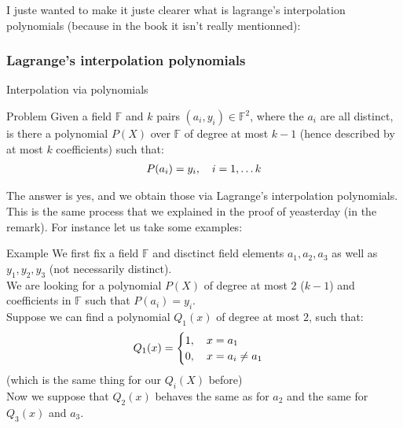    
   
 I juste wanted to make it juste clearer what is lagrange's interpolation polynomials (because in the book it isn't really mentionned):
 \subsubsection{Lagrange's interpolation polynomials}
 \begin{parag}{Interpolation via polynomials}
     \begin{subparag}{Problem}
         Given a field $\mathbb{F}$ and $k$ pairs $\left(a_i, y_i\right)\in \mathbb{F}^2$, where the $a_i$ are all distinct, is there a polynomial $P\left(X\right)$ over $\mathbb{F}$ of degree at most $k-1$ (hence described by at most $k$ coefficients) such that:
         \begin{align*} 
             P\left(a_i\right) =  y_i, \mathspace i = 1, \ldots k
         \end{align*}
     \end{subparag}
     The answer is yes, and we obtain those via Lagrange's interpolation polynomials.\\
     This is the same process that we explained in the proof of yeasterday (in the remark). For instance let us take some examples:
     \begin{subparag}{Example}
         We first fix a field $\mathbb{F}$ and disctinct field elements $a_1, a_2, a_3$ as well as $y_1, y_2, y_3  $ (not necessarily distinct).\\
         We are looking for a polynomial $P\left(X\right)$ of degree at most $2$ ($k-1 $) and coefficients in $\mathbb{F}$ such that $P\left(a_i\right) =  y_i$.\\
         Suppose we can find a polynomial $Q_1\left(x\right)$ of degree at most $2$, such that:
         \begin{align*} 
             Q_1\left(x\right) =  
             \begin{cases}
                 1, \mathspace x = a_1\\
                 0, \mathspace x =  a_i \neq a_1
             \end{cases}
         \end{align*}
         (which is the same thing for our $Q_i\left(X\right)$ before)\\
         Now we suppose that $Q_2\left(x\right)$ behaves the same as for $a_2$ and the same for $Q_3\left(x\right)$ and $a_3$.\\

\end{subparag}
\end{parag}
